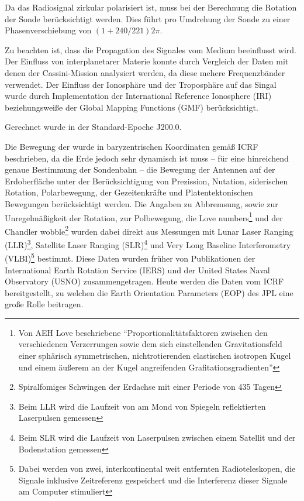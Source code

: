 Da das Radiosignal zirkular polarisiert ist, muss bei der Berechnung die Rotation der Sonde berücksichtigt werden.
Dies führt pro Umdrehung der Sonde zu einer Phasenverschiebung von $(1+240/221) 2\pi$. %

Zu beachten ist, dass die Propagation des Signales vom Medium beeinflusst wird. Der Einfluss von interplanetarer Materie konnte durch Vergleich
der Daten mit denen der Cassini-Mission analysiert werden, da diese mehere Frequenzbänder verwendet.\cite{Dittus2006} %
Der Einfluss der Ionosphäre und der Troposphäre auf das Singal wurde durch Implementation der International Reference Ionosphere (IRI)
beziehungsweiße der Global Mapping Functions (GMF) berücksichtigt.\cite{Levey2008} %

Gerechnet wurde in der Standard-Epoche J200.0. %

Die Bewegung der wurde in baryzentrischen Koordinaten gemäß ICRF beschrieben, %
da die Erde jedoch sehr dynamisch ist muss – für eine hinreichend genaue Bestimmung der Sondenbahn –
die Bewegung der Antennen auf der Erdoberfläche unter der Berücksichtigung von Prezission, Nutation,
siderischen Rotation, Polarbewegung, der Gezeitenkräfte und Platentektonischen Bewegungen berücksichtigt werden.
Die Angaben zu Abbremsung, sowie zur Unregelmäßigkeit der Rotation, zur Polbewegung, die Love numbers\footnote{Von AEH
Love beschriebene ``Proportionalitätsfaktoren zwischen den verschiedenen Verzerrungen sowie dem sich einstellenden
Gravitationsfeld einer sphärisch symmetrischen, nichtrotierenden elastischen isotropen Kugel und einem äußerem an der
Kugel angreifenden Grafitationsgradienten''\cite{Dittus2006}} und der Chandler wobble\footnote{Spiralfomiges Schwingen
der Erdachse mit einer Periode von 435 Tagen} %
wurden dabei direkt aus Messungen mit Lunar Laser Ranging (LLR)\footnote{Beim LLR wird die Laufzeit von am Mond von
Spiegeln reflektierten Laserpulsen gemessen}, Satellite Laser Ranging (SLR)\footnote{Beim SLR wird die Laufzeit von
Laserpulsen zwischen einem Satellit und der Bodenstation gemessen} und Very Long Baseline Interferometry
(VLBI)\footnote{Dabei werden von zwei, interkontinental weit entfernten Radioteleskopen, die Signale inklusive
Zeitreferenz gespeichert und die Interferenz dieser Signale am Computer stimuliert} bestimmt.
Diese Daten wurden früher von Publikationen der International Earth Rotation Service (IERS) und der United States Naval Observatory (USNO) zusammengetragen. Heute werden die Daten vom ICRF bereitgestellt, zu welchen die Earth Orientation Parameters
(EOP) des JPL eine große Rolle beitragen.\cite{Anderson2002}

